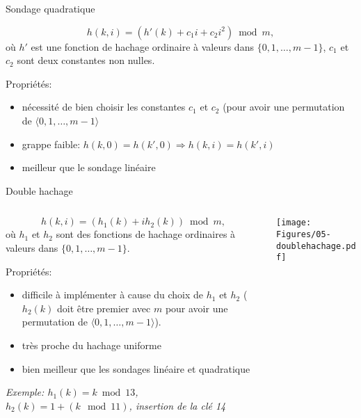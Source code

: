 \begin{frame}{Sondage quadratique}

$$h(k,i)=(h'(k)+c_1 i+ c_2 i^2) \bmod m,$$
où $h'$ est une fonction de hachage ordinaire à valeurs dans $\{0,1,\ldots,m-1\}$, $c_1$ et $c_2$ sont deux constantes non nulles.

\bigskip

Propriétés:
\begin{itemize}
\item nécessité de bien choisir les constantes $c_1$ et $c_2$ (pour
  avoir une permutation de $\langle 0,1,\ldots,m-1\rangle$
\item grappe faible: $h(k,0)=h(k',0)\Rightarrow h(k,i)=h(k',i)$
\item meilleur que le sondage linéaire
\end{itemize}

\end{frame}

\begin{frame}{Double hachage}

\begin{columns}
\begin{column}{9cm}

$$h(k,i)=(h_1(k)+i h_2(k))\bmod m,$$
où $h_1$ et $h_2$ sont des fonctions de hachage ordinaires à valeurs dans $\{0,1,\ldots,m-1\}$.

\bigskip

Propriétés:
\begin{itemize}
\item difficile à implémenter à cause du choix de $h_1$ et $h_2$ ($h_2(k)$ doit être premier avec $m$ pour avoir une permutation de $\langle 0,1,\ldots,m-1\rangle$).
\item très proche du hachage uniforme
\item bien meilleur que les sondages linéaire et quadratique
\end{itemize}

\bigskip

\emph{Exemple: $h_1(k)=k\bmod 13$, $h_2(k)=1+(k\mod 11)$, insertion de la clé 14}

\end{column}
\begin{column}{2.5cm}
\begin{center}
\texttt{[image: Figures/05-doublehachage.pdf]}
\end{center}
\end{column}
\end{columns}
\end{frame}

